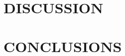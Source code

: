 \documentclass[aps,prd,twocolumn,amsmath,amssymb,groupedaddress]{revtex4-2}
\begin{document}
\section{\label{sec:disscussion} DISCUSSION}

\section{\label{sec:conclusion} CONCLUSIONS}


%



%
\end{document}
